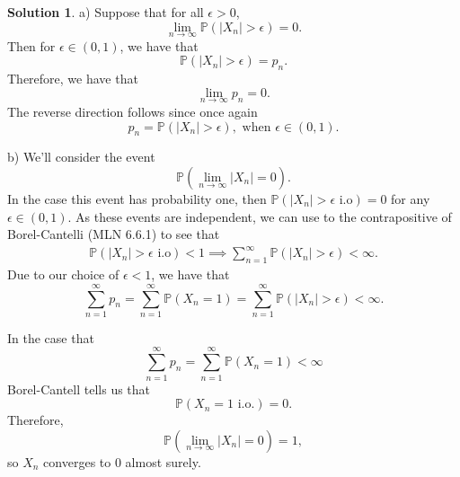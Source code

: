 \documentclass[12pt]{article}
\newcommand{\Prob}{\mathbb{P}}
\newcommand{\abs}[1]{ \left| #1 \right| }
\theoremstyle{definition}
\newtheorem{sol}{Solution}
\theoremstyle{remark}
\begin{document}
\begin{sol}
    a) Suppose that for all $\epsilon > 0$, 
    \begin{equation*}
        \lim_{n\to \infty} \Prob( \abs{X_{n}} > \epsilon) = 0.
    \end{equation*}
    Then for $\epsilon \in (0, 1)$, we have that 
     \begin{equation*}
         \Prob( \abs{X_{n}} > \epsilon) = p_{n}.
    \end{equation*}
    Therefore, we have that 
    \begin{equation*}
    \lim_{n\to \infty} p_{n} = 0.
    \end{equation*}
    The reverse direction follows since once again 
    \begin{equation*}
        p_{n} = \Prob( \abs{X_{n}} > \epsilon), \text{ when }\epsilon \in (0,1).
    \end{equation*}


    b) We'll consider the event 
    \begin{equation*}
        \Prob( \lim_{n\to\infty} \abs{X_{n}} = 0 ).
    \end{equation*}
    In the case this event has probability one, then $\Prob( \abs{X_{n}} > \epsilon \text{ i.o}) = 0$ for any $\epsilon \in (0,1)$. As these events are independent, we can use to the contrapositive of Borel-Cantelli (MLN 6.6.1) to see that
    \begin{align*}
       \Prob( \abs{X_{n}} > \epsilon \text{ i.o}) < 1 \implies \sum_{n=1}^{\infty} \Prob(\abs{X_{n}} > \epsilon) < \infty.
    \end{align*}
    Due to our choice of $\epsilon < 1$, we have that
     \begin{equation*}
         \sum_{n=1}^{\infty} p_{n} = \sum_{n=1}^{\infty} \Prob( X_{n} = 1) = \sum_{n=1}^{\infty} \Prob(\abs{X_{n}} > \epsilon) < \infty.
    \end{equation*}

    In the case that 
    \begin{equation*}
        \sum_{n=1}^{\infty} p_{n} = \sum_{n=1}^{\infty} \Prob( X_{n} = 1) < \infty
    \end{equation*}
    Borel-Cantell tells us that
    \begin{equation*}
        \Prob( X_{n} = 1 \text{ i.o.} ) = 0.
    \end{equation*}
    Therefore, 
    \begin{equation*}
        \Prob( \lim_{n\to \infty } \abs{X_{n}} = 0 ) = 1,
    \end{equation*}
    so  $X_{n}$ converges to 0 almost surely.


\end{sol}
\end{document}
